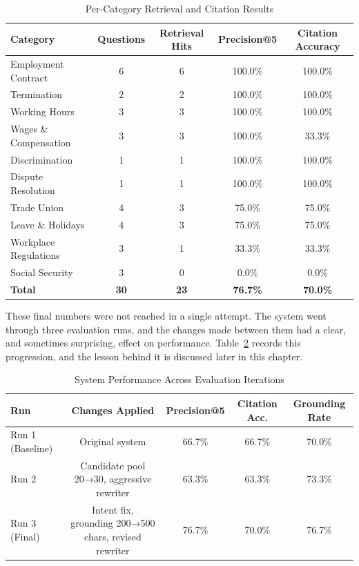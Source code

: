 \begin{table}[H]
\centering
\caption{Per-Category Retrieval and Citation Results}
\label{tab:category_results}
\begin{tabular}{lcccc}
\toprule
\textbf{Category} & \textbf{Questions} & \textbf{Retrieval Hits} & \textbf{Precision@5} & \textbf{Citation Accuracy} \\
\midrule
Employment Contract  & 6 & 6 & 100.0\% & 100.0\% \\
Termination          & 2 & 2 & 100.0\% & 100.0\% \\
Working Hours        & 3 & 3 & 100.0\% & 100.0\% \\
Wages \& Compensation & 3 & 3 & 100.0\% & 33.3\% \\
Discrimination       & 1 & 1 & 100.0\% & 100.0\% \\
Dispute Resolution   & 1 & 1 & 100.0\% & 100.0\% \\
Trade Union          & 4 & 3 & 75.0\%  & 75.0\% \\
Leave \& Holidays    & 4 & 3 & 75.0\%  & 75.0\% \\
Workplace Regulations & 3 & 1 & 33.3\% & 33.3\% \\
Social Security      & 3 & 0 & 0.0\%  & 0.0\% \\
\midrule
\textbf{Total}       & \textbf{30} & \textbf{23} & \textbf{76.7\%} & \textbf{70.0\%} \\
\bottomrule
\end{tabular}
\end{table}

\hs These final numbers were not reached in a single attempt. The system went through
three evaluation runs, and the changes made between them had a clear, and sometimes
surprising, effect on performance. Table~\ref{tab:iteration_results} records this
progression, and the lesson behind it is discussed later in this chapter.

\begin{table}[H]
\centering
\caption{System Performance Across Evaluation Iterations}
\label{tab:iteration_results}
\begin{tabular}{lcccc}
\toprule
\textbf{Run} & \textbf{Changes Applied} & \textbf{Precision@5} & \textbf{Citation Acc.} & \textbf{Grounding Rate} \\
\midrule
Run 1 (Baseline) & Original system & 66.7\% & 66.7\% & 70.0\% \\
Run 2 & Candidate pool 20→30, aggressive rewriter & 63.3\% & 63.3\% & 73.3\% \\
Run 3 (Final) & Intent fix, grounding 200→500 chars, revised rewriter & 76.7\% & 70.0\% & 76.7\% \\
\bottomrule
\end{tabular}
\end{table}

